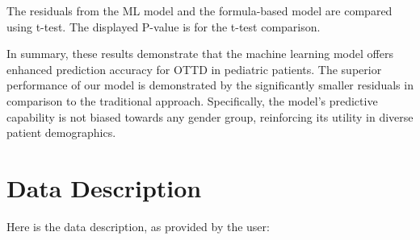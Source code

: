 \documentclass[11pt]{article}
\begin{document}
\begin{table}[h]
\caption{Comparison of residuals between the Machine Learning model and Formula-based model}
\label{table:table1}
\begin{threeparttable}
\renewcommand{\TPTminimum}{\linewidth}
\begin{tablenotes}
\footnotesize
\item The residuals from the ML model and the formula-based model are compared using t-test. The displayed P-value is for the t-test comparison.
\end{tablenotes}
\end{threeparttable}
\end{table}


In summary, these results demonstrate that the machine learning model offers enhanced prediction accuracy for OTTD in pediatric patients. The superior performance of our model is demonstrated by the significantly smaller residuals in comparison to the traditional approach. Specifically, the model's predictive capability is not biased towards any gender group, reinforcing its utility in diverse patient demographics.


\clearpage
\appendix

\section{Data Description} \label{sec:data_description} Here is the data description, as provided by the user:
\end{document}
